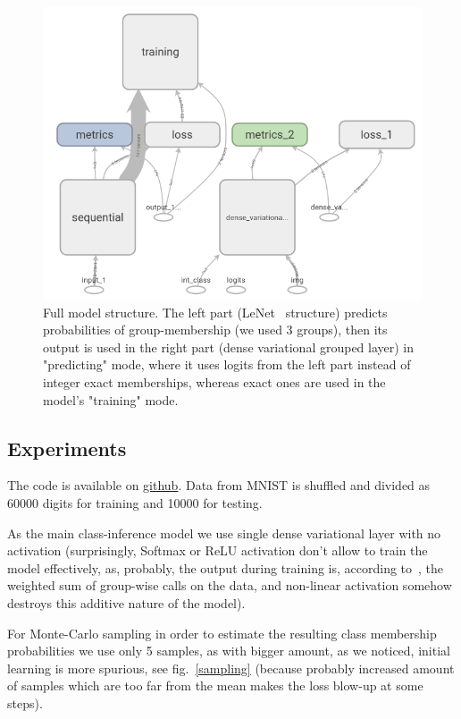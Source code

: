 \documentclass{article}
\begin{document}
\begin{figure}[h!]
	\centering
		\includegraphics[width=14cm]{graph.png}
	\caption{Full model structure. The left part (LeNet~\cite{lenet} structure) predicts probabilities of group-membership (we used 3 groups), then its output is used in the right part (dense variational grouped layer) in "predicting" mode, where it uses logits from the left part instead of integer exact memberships, whereas exact ones are used in the model's "training" mode.}
	\label{tf_structure}
\end{figure}

\subsection*{Experiments}
The code is available on \href{https://github.com/antmaxi/Hierarchical-Variational-Learning}{github}.
Data from MNIST is shuffled and divided as 60000 digits for training and 10000 for testing.

As the main class-inference model we use single dense variational layer with no activation (surprisingly, Softmax or ReLU activation don't allow to train the model effectively, as, probably, the output during training is, according to~\cite{Gestures}, the weighted sum of group-wise calls on the data, and non-linear activation somehow destroys this additive nature of the model).

For Monte-Carlo sampling in order to estimate the resulting class membership probabilities we use only 5 samples, as with bigger amount, as we noticed, initial learning is more spurious, see fig.~\ref{sampling} (because probably increased amount of samples which are too far from the mean makes the loss blow-up at some steps).%
\end{document}
